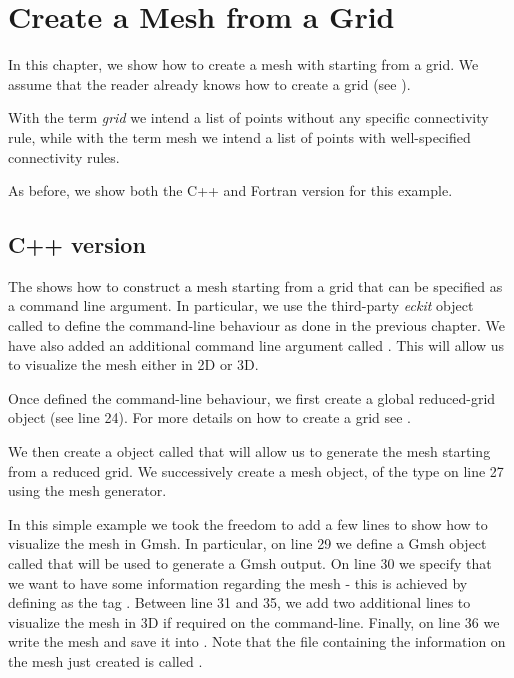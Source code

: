 \chapter{Create a Mesh from a Grid}
In this chapter, we show how to create a mesh with \Atlas 
starting from a grid. We assume that the reader already 
knows how to create a grid (see ). 
% 
\begin{notebox}
With the term \textit{grid} we intend a list of points 
without any specific connectivity rule, while with the 
term mesh we intend a list of points with well-specified 
connectivity rules.
\end{notebox}
%
As before, we show both the C++ and Fortran version 
for this example.


\section{C++ version}
The  shows how to construct a mesh 
starting from a grid that can be specified as a command 
line argument. In particular, we use the third-party 
\textit{eckit} object called  to define 
the command-line behaviour as done in the previous chapter. 
We have also added an additional command line argument 
called . This will allow us to 
visualize the mesh either in 2D or 3D. 
%

%
Once defined the command-line behaviour, we first create 
a global reduced-grid object (see line 24). For more 
details on how to create a grid see .

We then create a 
 object called 
that will allow us to generate the mesh starting from
a reduced grid.
We successively create a mesh object,  
of the  type on line 27 using the mesh generator.

In this simple example we took the freedom to add a few 
lines to show how to visualize the mesh in Gmsh. In particular, 
on line 29 we define a Gmsh object called  that 
will be used to generate a Gmsh output. On line 30 we specify 
that we want to have some information regarding the mesh - this 
is achieved by defining as  the tag .
Between line 31 and 35, we add two additional lines to visualize 
the mesh in 3D if required on the command-line.
Finally, on line 36 we write the mesh and save it into .
Note that the file containing the information on the mesh 
just created is called .

